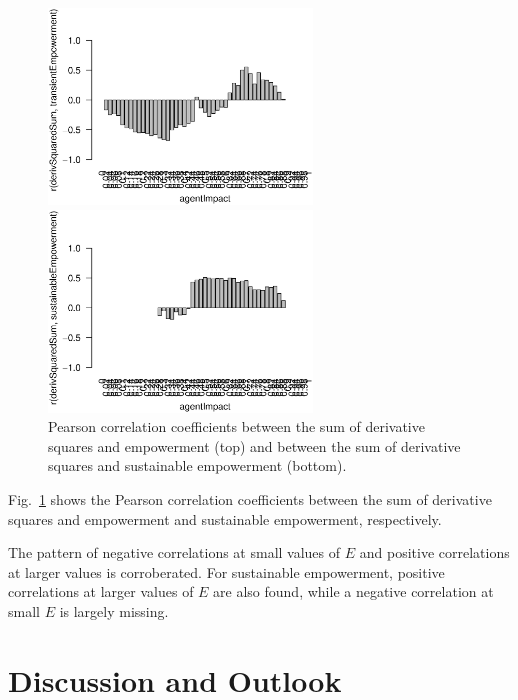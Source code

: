 \documentclass[conference]{IEEEtran}
\begin{document}
\begin{figure}

  \begin{center}

    \includegraphics[width=7cm]{n08_full_small_corr_dss_emp.eps}

    \includegraphics[width=7cm]{n08_full_small_corr_dss_empsust.eps}

  \end{center}

  \caption{Pearson correlation coefficients between the sum of derivative
    squares and empowerment (top) and between the sum of derivative
    squares and sustainable empowerment (bottom).}
  \label{fig_dssempcorr}

\end{figure}

Fig.~\ref{fig_dssempcorr} shows the Pearson correlation coefficients
between the sum of derivative squares and empowerment and sustainable
empowerment, respectively.

The pattern of negative correlations at small values of $E$ and
positive correlations at larger values is corroberated. For
sustainable empowerment, positive correlations at larger values of $E$
are also found, while a negative correlation at small $E$ is largely
missing.



\section{Discussion and Outlook}
\end{document}

